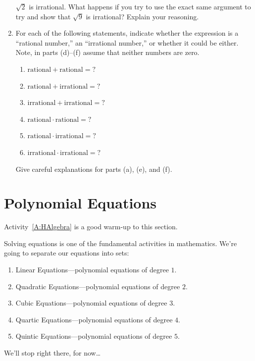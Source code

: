 \begin{problems}
\begin{enumerate}
  $\sqrt{2}$ is irrational. What happens if you try to use the exact
  same argument to try and show that $\sqrt{9}$ is irrational? Explain
  your reasoning.
\item For each of the following statements, indicate whether the expression
is a ``rational number,'' an ``irrational number,'' or whether it could be
either. Note, in parts (d)--(f) assume that neither numbers are zero.
\begin{enumerate}
\item $\text{rational}+ \text{rational} = ?$
\item $\text{rational}+ \text{irrational} = ?$
\item $\text{irrational}+ \text{irrational} = ?$

\item $\text{rational}\cdot \text{rational} = ?$
\item $\text{rational}\cdot \text{irrational} = ?$
\item $\text{irrational}\cdot \text{irrational} = ?$
\end{enumerate}
Give careful explanations for parts (a), (e), and (f).
\end{enumerate}
\end{problems}
\newpage




\section{Polynomial Equations}


\begin{activitynote}
Activity~\ref{A:HAlgebra} is a good warm-up to this section.  %
\end{activitynote}

Solving equations is one of the fundamental activities in mathematics.
We're going to separate our equations into sets:
\begin{enumerate}
\item Linear Equations---polynomial equations of degree $1$.
\item Quadratic Equations---polynomial equations of degree $2$.
\item Cubic  Equations---polynomial equations of degree $3$.
\item Quartic Equations---polynomial equations of degree $4$.
\item Quintic Equations---polynomial equations of degree $5$.
\end{enumerate}
We'll stop right there, for now\dots


